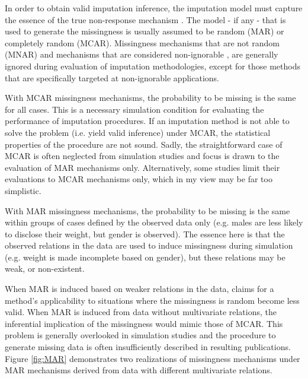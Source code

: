 \documentclass[bimj,fleqn]{w-art}
\theoremstyle{plain}
\theoremstyle{definition}
\begin{document}
In order to obtain valid imputation inference, the imputation model must capture the essence of the true non-response mechanism \citep{meng94}. The model - if any - that is used to generate the missingness is usually assumed to be random (MAR) or completely random (MCAR). Missingness mechanisms that are not random (MNAR) and mechanisms that are considered non-ignorable \citep[see e.g.][]{rubi76}, are generally ignored during evaluation of imputation methodologies, except for those methods that are specifically targeted at non-ignorable applications.

With MCAR missingness mechanisms, the probability to be missing is the same for all cases. This is a necessary simulation condition for evaluating the performance of imputation procedures. If an imputation method is not able to solve the problem (i.e. yield valid inference) under MCAR, the statistical properties of the procedure are not sound. Sadly, the straightforward case of MCAR is often neglected from simulation studies and focus is drawn to the evaluation of MAR mechanisms only. Alternatively, some studies limit their evaluations to MCAR mechanisms only, which in my view may be far too simplistic. 

With MAR missingness mechanisms, the probability to be missing is the same within groups of cases defined by the observed data only (e.g. males are less likely to disclose their weight, but gender is observed). The essence here is that the observed relations in the data are used to induce missingness during simulation (e.g. weight is made incomplete based on gender), but these relations may be weak, or non-existent. 

When MAR is induced based on weaker relations in the data, claims for a method's applicability to situations where the missingness is random become less valid. When MAR is induced from data without multivariate relations, the inferential implication of the missingness would mimic those of MCAR. This problem is generally overlooked in simulation studies and the procedure to generate missing data is often insufficiently described in resulting publications. Figure \ref{fig:MAR} demonstrates two realizations of missingness mechanisms under MAR mechanisms derived from data with different multivariate relations. 
\end{document}
